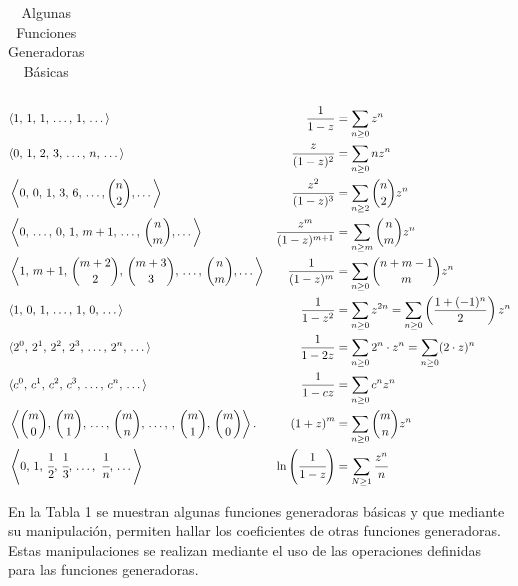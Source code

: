 \begin{table}[t]
\begin{tabularx}{\linewidth}{X}
\end{tabularx}
\label{tab:ogf-basic}
\begin{align*}
    &\langle 1,\, 1,\, 1,\,\dots,\,1,\,\dots \rangle
    &
    \frac{1}{1-z} &= \sum_{n\geq0}{z^n}
    \\
    &\langle 0,\,1,\,2,\,3,\,\dots,\,n,\,\dots \rangle
    &
    \frac{z}{(1-z)^2} &= \sum_{n\geq0}{nz^n}
    \\
    &\left\langle 0,\,0,\,1,\,3,\,6,\,\dots, \binom{n}{2}, \dots \right\rangle
    &
    \frac{z^2}{(1-z)^3} &= \sum_{n\geq2}{\binom{n}{2}z^n}
    \\
    &\left\langle 0,\,\dots,\,0,\,1,\,m+1,\,\dots,\,\binom{n}{m}, \dots \right\rangle
    &
    \frac{z^m}{(1-z)^{m+1}} &= \sum_{n\geq m}{\binom{n}{m}z^n}
    \\
    &\left\langle 1,\,m+1,\,\binom{m+2}{2},\,\binom{m+3}{3},\,\dots,\,\binom{n}{m}, \dots \right\rangle
    &
    \frac{1}{(1-z)^{m}} &= \sum_{n\geq 0}{\binom{n+m-1}{m}z^n}
    \\
    & \langle 1,\, 0,\, 1,\,\dots,\,1,\,0,\,\dots \rangle
    &
    \frac{1}{1-z^2} &= \sum_{n\geq0}{z^{2n}}= \sum_{n\geq0}\left(\frac{1+(-1)^n}{2}\right) z^{n}
    \\
    & \langle 2^0,\, 2^1,\, 2^2,\,2^3,\,\dots,\,2^n,\,\dots \rangle
    &
    \frac{1}{1-2z} &= \sum_{n\geq0}{2^n\cdot z^{n}}= \sum_{n\geq0}(2 \cdot z)^n
    \\
    & \langle c^0,\, c^1,\, c^2,\,c^3,\,\dots,\,c^n,\,\dots \rangle
    &
    \frac{1}{1-cz} &= \sum_{n\geq0}{c^nz^{n}}
    \\
    & \left\langle \binom{m}{0},\,\binom{m}{1},\,\dots,\,\binom{m}{n},\,\dots,\,
    ,\,\binom{m}{1},\,\binom{m}{0} \right\rangle.
    &
    \left(1+z\right)^m &= \sum_{n\geq0}{\binom{m}{n}z^n}
    \\
    & \left\langle 0,\, 1,\,\cfrac{1}{2},\,\cfrac{1}{3},\,\dots,\,
    \,\cfrac{1}{n},\,\dots \right\rangle
    &
    \ln{\left(\cfrac{1}{1-z}\right)} &= \sum_{N\geq1}{\cfrac{z^n}{n}}
\end{align*}
\caption{Algunas Funciones Generadoras Básicas}
\end{table}

En la Tabla 1 se muestran algunas funciones generadoras básicas y que mediante su manipulación, permiten hallar los coeficientes de otras funciones generadoras. Estas manipulaciones se realizan mediante el uso de las operaciones definidas para las funciones generadoras.

